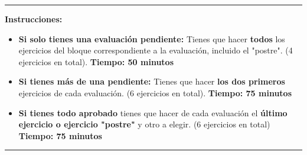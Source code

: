 \documentclass[addpoints,spanish, 12pt,a4paper]{exam}
\newcommand{\timelimit}{50 minutos}
\newcommand{\tipo}{A}\newcommand{\examnum}{Examen Global}
\begin{document}
\begin{center}
\rule[2ex]{\textwidth}{2pt}        
\textbf{Instrucciones:} \begin{itemize}
\item \textbf{Si solo tienes una evaluación pendiente:} Tienes que hacer \textbf{todos} los ejercicios del bloque correspondiente a la evaluación, incluido el "postre". (4 ejercicios en total). \textbf{Tiempo: 50 minutos}
\item \textbf{Si tienes más de una pendiente:} Tienes que hacer \textbf{los dos primeros} ejercicios de cada evaluación. (6 ejercicios en total). \textbf{Tiempo: 75 minutos}
\item \textbf{Si tienes todo aprobado} tienes que hacer de cada evaluación el \textbf{último ejercicio o ejercicio "postre"} y otro a elegir. (6 ejercicios en total) \textbf{Tiempo: 75 minutos}
\end{itemize}
\rule[2ex]{\textwidth}{2pt}
\end{center}

        
        
        
%       
%
%
%
\end{document}
